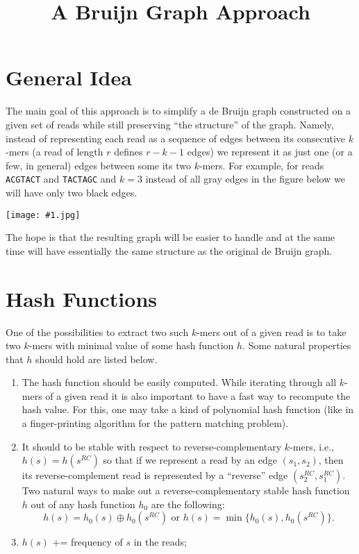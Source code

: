 \documentclass[12pt]{article}
\newcommand{\jpgpic}[1]{\begin{center}\texttt{[image: \#1.jpg]}\end{center}}
\begin{document}
\title{A Bruijn Graph Approach}
\maketitle

\section{General Idea}

The main goal of this approach is to simplify a de Bruijn graph
constructed on a given set of reads while still preserving 
``the structure'' of the graph. Namely, instead 
of representing each read as a sequence of edges 
between its consecutive $k$-mers (a read of length $r$ defines
$r-k-1$ edges) we represent it as just one (or a few, in general)
edges between some its two $k$-mers. For example, for 
reads {\tt ACGTACT} and {\tt TACTAGC} and $k=3$
instead of all gray edges in the figure below we will have 
only two black edges.
\jpgpic{fig1}
The hope is that the resulting graph will be easier to handle 
and at the same time will have essentially the same structure 
as the original de Bruijn graph.

\section{Hash Functions}

One of the possibilities to extract two such $k$-mers out of a given
read is to take two $k$-mers with minimal value of some hash function $h$.
Some natural properties that $h$ should hold are listed below.
\begin{enumerate}
  \item The hash function should be easily computed.
  While iterating through all $k$-mers of a given read
  it is also important to have a fast way to recompute 
  the hash value. For this, one may take a kind of polynomial
  hash function (like in a finger-printing algorithm for the pattern 
  matching problem).
  \item It should to be stable with respect to reverse-complementary 
  $k$-mers, i.e., $h(s) = h(s^{RC})$ so that if we represent a read
  by an edge $(s_1,s_2)$, then its reverse-complement read is represented by 
  a ``reverse'' edge $(s_2^{RC},s_1^{RC})$. Two natural ways to make out a
  reverse-complementary stable hash function $h$ out of any hash function 
  $h_0$ are the following:
  \[h(s) = h_0(s) \oplus h_0(s^{RC}) \textrm{ or } h(s) = \min\{h_0(s), h_0(s^{RC})\} .\]
  \item $h(s)$ += frequency of $s$ in the reads;

\end{enumerate}
\end{document}
